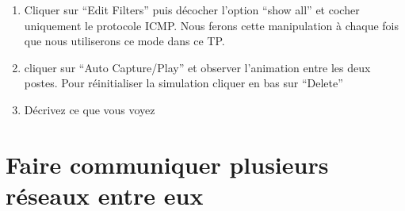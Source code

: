 \begin{exercice_cours}{}
\begin{enumerate}
        \item Cliquer sur ``Edit Filters'' puis décocher l'option ``show all'' et cocher uniquement le protocole ICMP. Nous ferons cette manipulation à chaque fois que nous utiliserons ce mode dans ce TP.
    
        \item cliquer sur ``Auto Capture/Play'' et observer l'animation entre les deux postes. Pour réinitialiser la simulation cliquer en bas sur ``Delete''
        
        \item Décrivez ce que vous voyez
        
        \begin{tcolorbox}[height = 1cm]
        
        \end{tcolorbox}

    \end{enumerate} 

\end{exercice_cours}

\section{Faire communiquer plusieurs réseaux entre eux}

